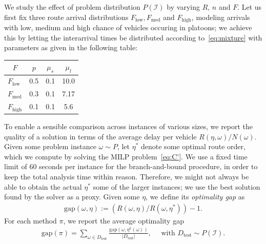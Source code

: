 \documentclass[a4paper]{report}
\theoremstyle{definition}
\theoremstyle{plain}
\begin{document}
We study the effect of problem distribution $P(\mathcal{I})$ by varying $R$,
$n$ and $F$.
%
Let us first fix three route arrival distributions
$F_\mathrm{low}, F_\mathrm{med}$ and $F_\mathrm{high}$, modeling arrivals with
low, medium and high chance of vehicles occuring in platoons; we achieve this by
letting the interarrival times be distributed according to~\eqref{eq:mixture}
with parameters as given in the following table:
%
\begin{center} %
  \begin{tabular}{l S[table-format=2.1] S[table-format=2.1] S[table-format=2.1]}
     &  &  &  \\
    \midrule
    $F_\mathrm{low}$  & 0.5 & 0.1 & 10.0 \\
    $F_\mathrm{med}$  & 0.3 & 0.1 &  7.17 \\
    $F_\mathrm{high}$ & 0.1 & 0.1 &  5.6
  \end{tabular}
\end{center}
%
To enable a sensible comparison across instances of various
sizes, we report the quality of a solution in terms of the average delay per
vehicle $R(\eta, \omega) / N(\omega)$.
%
Given some problem instance $\omega \sim P$, let $\eta^{*}$ denote some optimal route
order, which we compute by solving the MILP problem~\eqref{eq:C'}. We use a fixed time
limit of 60 seconds per instance for the branch-and-bound procedure, in order to
keep the total analysis time within reason. Therefore, we might not always be
able to obtain the actual $\eta^{*}$ some of the larger instances; we use the best
solution found by the solver as a proxy. Given some $\eta$, we define its \textit{optimality gap}
as
\begin{align*}
  \mathrm{gap}(\omega, \eta) := (R(\omega, \eta) / R(\omega, \eta^{*})) - 1 .
\end{align*}
For each method $\pi$, we report the average optimality gap
\begin{align*}
  \mathrm{gap}(\pi) = \sum_{\omega \in D_\mathrm{test}} \frac{\mathrm{gap}(\omega, \eta^\pi(\omega))}{|D_\mathrm{test}|} , \quad \text{ with } D_\mathrm{test} \sim P(\mathcal{I}) .
\end{align*}
\end{document}
